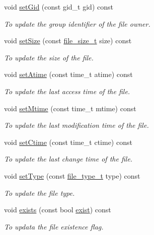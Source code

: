 \begin{DoxyCompactItemize}
void \hyperlink{classFile_a45b2b29b558a910648ac4077a7c26aae}{setGid} (const gid\_\-t gid) const 
\begin{DoxyCompactList}\small\item\em To update the group identifier of the file owner. \item\end{DoxyCompactList}\item 
void \hyperlink{classFile_a468b86e87c939649a4ec0939bd8cafa0}{setSize} (const \hyperlink{File_8hpp_aaf19f83503293d8d9fb6c5f7607cb5ee}{file\_\-size\_\-t} size) const 
\begin{DoxyCompactList}\small\item\em To update the size of the file. \item\end{DoxyCompactList}\item 
void \hyperlink{classFile_a066d14d55524520404641b26027ca815}{setAtime} (const time\_\-t atime) const 
\begin{DoxyCompactList}\small\item\em To update the last access time of the file. \item\end{DoxyCompactList}\item 
void \hyperlink{classFile_a3d419f6b7306952fdc0b73093ce7920c}{setMtime} (const time\_\-t mtime) const 
\begin{DoxyCompactList}\small\item\em To update the last modification time of the file. \item\end{DoxyCompactList}\item 
void \hyperlink{classFile_aaa8808f7df137f5460f2a06835b65930}{setCtime} (const time\_\-t ctime) const 
\begin{DoxyCompactList}\small\item\em To update the last change time of the file. \item\end{DoxyCompactList}\item 
void \hyperlink{classFile_a590877c07f2214045644e7daa77ca7bc}{setType} (const \hyperlink{File_8hpp_af728de96ee6e62d6340d3dba27941ec3}{file\_\-type\_\-t} type) const 
\begin{DoxyCompactList}\small\item\em To update the file type. \item\end{DoxyCompactList}\item 
void \hyperlink{classFile_a3dc1f3dc8c88a37d5b99499e4db75c3b}{exists} (const bool \hyperlink{classFile_a7551ebf856afc07947078a4cb3a2823f}{exist}) const 
\begin{DoxyCompactList}\small\item\em To updata the file existence flag. \item\end{DoxyCompactList}\end{DoxyCompactItemize}
